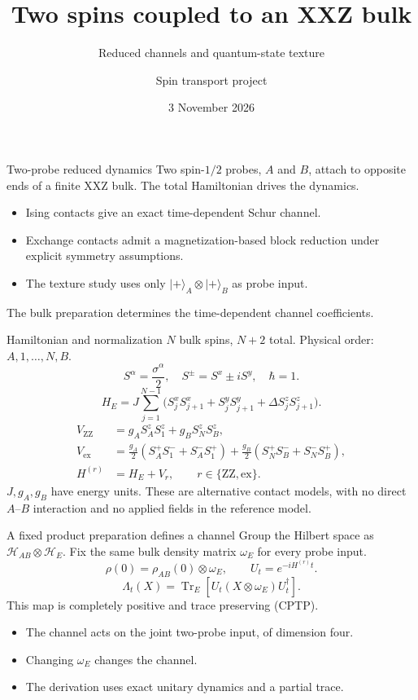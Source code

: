 \documentclass[aspectratio=169,11pt]{beamer}
\title{Two spins coupled to an XXZ bulk}
\subtitle{Reduced channels and quantum-state texture}
\author{Spin transport project}
\date{3 November 2026}
\newcommand{\ket}[1]{\lvert #1\rangle}
\newcommand{\Tr}{\operatorname{Tr}}
\newcommand{\ZZ}{\mathrm{ZZ}}
\newcommand{\ex}{\mathrm{ex}}
\begin{document}
\begin{frame}[plain]
\titlepage
\end{frame}

\begin{frame}{Two-probe reduced dynamics}
Two spin-$1/2$ probes, $A$ and $B$, attach to opposite ends of a finite
XXZ bulk. The total Hamiltonian drives the dynamics.
\medskip
\begin{itemize}\setlength\itemsep{9pt}
\item Ising contacts give an exact time-dependent Schur channel.
\item Exchange contacts admit a magnetization-based block reduction
under explicit symmetry assumptions.
\item The texture study uses only $\ket+_A\otimes\ket+_B$ as probe input.
\end{itemize}
\medskip
The bulk preparation determines the time-dependent channel coefficients.
\end{frame}

\begin{frame}{Hamiltonian and normalization}
\small
$N$ bulk spins, $N+2$ total. Physical order: $A,1,\ldots,N,B$.
\[
S^\alpha=\frac{\sigma^\alpha}{2},\quad
S^\pm=S^x\pm iS^y,\quad \hbar=1.
\]
\[
H_E=J\sum_{j=1}^{N-1}
\bigl(S_j^xS_{j+1}^x+S_j^yS_{j+1}^y+\Delta S_j^zS_{j+1}^z\bigr).
\]
\begin{align*}
V_{\ZZ}&=g_A S_A^zS_1^z+g_B S_N^zS_B^z,\\
V_{\ex}&=\frac{g_A}{2}(S_A^+S_1^-+S_A^-S_1^+)
         +\frac{g_B}{2}(S_N^+S_B^-+S_N^-S_B^+),\\
H^{(r)}&=H_E+V_r,\qquad r\in\{\ZZ,\ex\}.
\end{align*}
$J,g_A,g_B$ have energy units. These are alternative contact models,
with no direct $A$--$B$ interaction and no applied fields in the reference model.
\end{frame}

\begin{frame}{A fixed product preparation defines a channel}
Group the Hilbert space as $\mathcal H_{AB}\otimes\mathcal H_E$.
Fix the same bulk density matrix $\omega_E$ for every probe input.
\[
\rho(0)=\rho_{AB}(0)\otimes\omega_E,\qquad U_t=e^{-iH^{(r)}t}.
\]
\[
\boxed{\Lambda_t(X)=\Tr_E[U_t(X\otimes\omega_E)U_t^\dagger].}
\]
This map is completely positive and trace preserving (CPTP).
\medskip
\begin{itemize}\setlength\itemsep{7pt}
\item The channel acts on the joint two-probe input, of dimension four.
\item Changing $\omega_E$ changes the channel.
\item The derivation uses exact unitary dynamics and a partial trace.
\end{itemize}
\end{frame}
\end{document}
